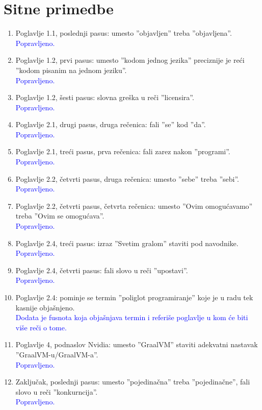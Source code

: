 \documentclass[a4paper]{report}
\newcommand{\odgovor}[1]{\textcolor{blue}{#1}}
\begin{document}
	\section{Sitne primedbe}
	\begin{enumerate}
		\item Poglavlje 1.1, poslednji pasus: umesto ''objavljen'' treba ''objavljena''.\\
		\odgovor{Popravljeno.}
		\item Poglavlje 1.2, prvi pasus: umesto ''kodom jednog jezika'' preciznije je reći ''kodom pisanim na jednom jeziku''.\\
		\odgovor{Popravljeno.}
		\item Poglavlje 1.2, šesti pasus: slovna greška u reči ''licensira''.\\
		\odgovor{Popravljeno.}
		\item Poglavlje 2.1, drugi pasus, druga rečenica: fali ''se'' kod ''da''.\\
		\odgovor{Popravljeno.}
		\item Poglavlje 2.1, treći pasus, prva rečenica: fali zarez nakon ''programi''.\\
		\odgovor{Popravljeno.}
		\item Poglavlje 2.2, četvrti pasus, druga rečenica: umesto ''sebe'' treba ''sebi''.\\
		\odgovor{Popravljeno.}
		\item Poglavlje 2.2, četvrti pasus, četvrta rečenica: umesto ''Ovim omogućavamo''	treba ''Ovim se omogućava''.\\
		\odgovor{Popravljeno.}
		\item Poglavlje 2.4, treći pasus: izraz ''Svetim gralom''  staviti pod navodnike.\\
		\odgovor{Popravljeno.}
		\item Poglavlje 2.4, četvrti pasus: fali slovo u reči ''upostavi''.\\
		\odgovor{Popravljeno.}
		\item Poglavlje 2.4: pominje se termin ''poliglot programiranje'' koje je u radu tek kasnije objašnjeno.\\
		\odgovor{Dodata je fusnota koja objašnjava termin i referiše poglavlje u kom će biti više reči o tome.}
		\item Poglavlje 4, podnaslov Nvidia: umesto ''GraalVM'' staviti adekvatni nastavak ''GraalVM-u/GraalVM-a''.\\
		\odgovor{Popravljeno.}
		\item Zaključak, poslednji pasus: umesto ''pojedinačna'' treba ''pojedinačne'', fali slovo u reči ''konkurncija''.\\
		\odgovor{Popravljeno.}
	\end{enumerate}
	
\end{document}

